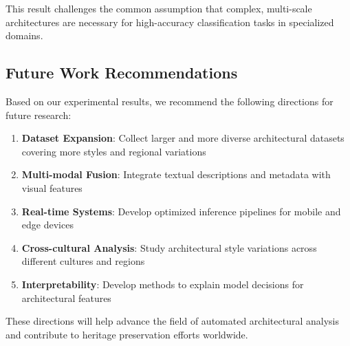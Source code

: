 This result challenges the common assumption that complex, multi-scale architectures are necessary for high-accuracy classification tasks in specialized domains.

\subsection{Future Work Recommendations}

Based on our experimental results, we recommend the following directions for future research:

\begin{enumerate}
    \item \textbf{Dataset Expansion}: Collect larger and more diverse architectural datasets covering more styles and regional variations
    \item \textbf{Multi-modal Fusion}: Integrate textual descriptions and metadata with visual features
    \item \textbf{Real-time Systems}: Develop optimized inference pipelines for mobile and edge devices
    \item \textbf{Cross-cultural Analysis}: Study architectural style variations across different cultures and regions
    \item \textbf{Interpretability}: Develop methods to explain model decisions for architectural features
\end{enumerate}

These directions will help advance the field of automated architectural analysis and contribute to heritage preservation efforts worldwide.
